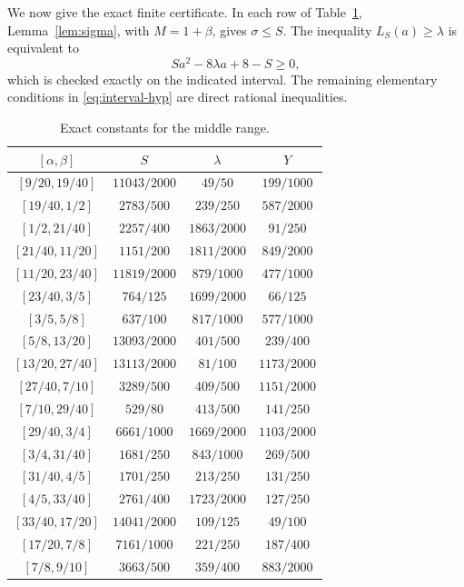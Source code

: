 \documentclass[11pt]{article}
\theoremstyle{remark}
\begin{document}
We now give the exact finite certificate.  In each row of
Table~\ref{tab:middle}, Lemma~\ref{lem:sigma}, with $M=1+\beta$, gives
$\sigma\le S$.  The inequality $L_S(a)\ge\lambda$ is equivalent to
\[
 Sa^2-8\lambda a+8-S\ge0,
\]
which is checked exactly on the indicated interval.  The remaining elementary
conditions in \eqref{eq:interval-hyp} are direct rational inequalities.

\begin{table}[H]
\centering
\small
\renewcommand{\arraystretch}{1.18}
\caption{Exact constants for the middle range.}
\label{tab:middle}
\begin{tabular}{@{}c c c c@{}}
\toprule
$[\alpha,\beta]$ & $S$ & $\lambda$ & $Y$\\
\midrule
$[9/20,19/40]$ & $11043/2000$ & $49/50$ & $199/1000$\\
$[19/40,1/2]$ & $2783/500$ & $239/250$ & $587/2000$\\
$[1/2,21/40]$ & $2257/400$ & $1863/2000$ & $91/250$\\
$[21/40,11/20]$ & $1151/200$ & $1811/2000$ & $849/2000$\\
$[11/20,23/40]$ & $11819/2000$ & $879/1000$ & $477/1000$\\
$[23/40,3/5]$ & $764/125$ & $1699/2000$ & $66/125$\\
$[3/5,5/8]$ & $637/100$ & $817/1000$ & $577/1000$\\
$[5/8,13/20]$ & $13093/2000$ & $401/500$ & $239/400$\\
$[13/20,27/40]$ & $13113/2000$ & $81/100$ & $1173/2000$\\
$[27/40,7/10]$ & $3289/500$ & $409/500$ & $1151/2000$\\
$[7/10,29/40]$ & $529/80$ & $413/500$ & $141/250$\\
$[29/40,3/4]$ & $6661/1000$ & $1669/2000$ & $1103/2000$\\
$[3/4,31/40]$ & $1681/250$ & $843/1000$ & $269/500$\\
$[31/40,4/5]$ & $1701/250$ & $213/250$ & $131/250$\\
$[4/5,33/40]$ & $2761/400$ & $1723/2000$ & $127/250$\\
$[33/40,17/20]$ & $14041/2000$ & $109/125$ & $49/100$\\
$[17/20,7/8]$ & $7161/1000$ & $221/250$ & $187/400$\\
$[7/8,9/10]$ & $3663/500$ & $359/400$ & $883/2000$\\
\bottomrule
\end{tabular}
\end{table}
\end{document}
